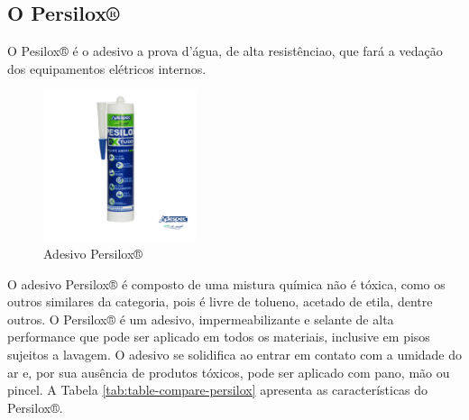 \subsection{O Persilox®}
O  Pesilox® é o adesivo a prova d’água, de alta resistênciao, que fará a vedação dos equipamentos elétricos internos.
\par
\begin{figure}[h]
  \centering
  \includegraphics[width=0.4\textwidth]{figures/persilox.png}
  \caption{Adesivo Persilox®}
  \label{fig:persilox}
\end{figure}
\FloatBarrier
\par

O adesivo Persilox® é composto de uma mistura química não é tóxica, como os outros similares da categoria, pois é livre de tolueno, acetado de etila, dentre outros. O Persilox® é um adesivo, impermeabilizante e selante de alta performance que pode ser aplicado em todos os materiais, inclusive em pisos sujeitos a lavagem. O adesivo se solidifica ao entrar em contato com a umidade do ar e, por sua ausência de produtos tóxicos, pode ser aplicado com pano, mão ou pincel. A Tabela \ref{tab:table-compare-persilox} apresenta as características do Persilox®.

